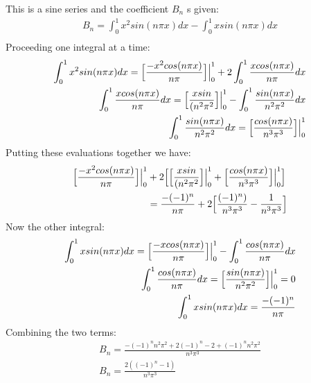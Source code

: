 \documentclass{article}
\begin{document}
This is a sine series and the coefficient $B_n$ s given:
\begin{equation}
\begin{aligned}
B_n = \int_0^1x^2sin(n\pi x)dx - \int_0^1xsin(n\pi x)dx\\
\end{aligned}
\end{equation}
Proceeding one integral at a time:
\begin{equation}
\begin{aligned}
\int_0^1x^2sin(n\pi x)dx = \Big{[}\frac{-x^2cos(n\pi x)}{n\pi} \Big{]}\Big{|}_0^1 + 2\int_0^1\frac{xcos(n\pi x)}{n\pi}dx\\
\int_0^1\frac{xcos(n\pi x)}{n\pi}dx = \Big{[}\frac{xsin}{(n^2\pi^2} \Big{]}\Big{|}_0^1 - \int_0^1\frac{sin(n\pi x)}{n^2\pi^2}dx\\
\int_0^1\frac{sin(n\pi x)}{n^2\pi^2}dx = \Big{[}\frac{cos(n\pi x)}{n^3\pi^3}\Big{]}\Big{|}_0^1
\end{aligned}
\end{equation}
Putting these evaluations together we have:
\begin{equation}
\begin{aligned}
 \Big{[}\frac{-x^2cos(n\pi x)}{n\pi} \Big{]}\Big{|}_0^1 & + 2 \Big{[}\Big{[}\frac{xsin}{(n^2\pi^2} \Big{]}\Big{|}_0^1 + \Big{[}\frac{cos(n\pi x)}{n^3\pi^3}\Big{]}\Big{|}_0^1 \Big{]}\\
 &= \frac{-(-1)^n}{n\pi} + 2 \Big{[}\frac{(-1)^n)}{n^3\pi^3} - \frac{1}{n^3\pi^3} \Big{]}
\end{aligned}
\end{equation}
Now the other integral:
\begin{equation}
\begin{aligned}
\int_0^1xsin(n\pi x)dx = \Big{[}\frac{-x cos(n\pi x)}{n\pi} \Big{]}\Big{|}_0^1 - \int_0^1\frac{cos(n\pi x)}{n\pi}dx\\
\int_0^1\frac{cos(n\pi x)}{n\pi}dx = \Big{[} \frac{sin(n\pi x)}{n^2\pi^2} \Big{]} \Big{|}_0^1 = 0\\
\int_0^1xsin(n\pi x)dx = \frac{-(-1)^n}{n\pi}
\end{aligned}
\end{equation}
Combining the two terms:
\begin{equation}
\begin{aligned}
B_n = \frac{-(-1)^n n^2\pi^2 + 2(-1)^n - 2 + (-1)^nn^2\pi^2}{n^3\pi^3}\\
B_n = \frac{2( (-1)^n - 1)}{n^3\pi^3}
\end{aligned}
\end{equation}
\end{document}

